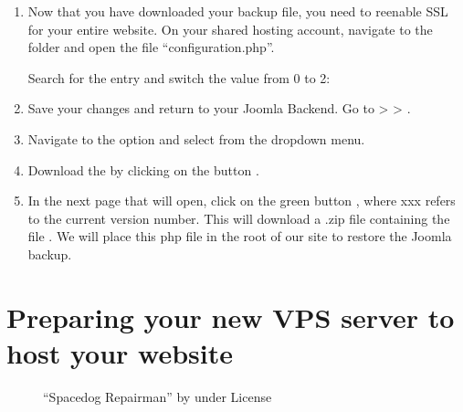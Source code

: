 \documentclass[letterpaper,10pt,english]{sphinxmanual}
\let\sphinxpxdimen\pdfpxdimen\else\newdimen\sphinxpxdimen
\begin{document}
\begin{enumerate}
\item {} 
\sphinxAtStartPar
Now that you have downloaded your backup file, you need to re\sphinxhyphen{}enable SSL for your entire website. On your shared hosting account, navigate to the folder  and open the file “configuration.php”.

\sphinxAtStartPar
Search for the entry  and switch the value from 0 to 2:
\begin{quote}

\begin{sphinxVerbatim}[commandchars=\\\{\}]
\end{sphinxVerbatim}
\end{quote}

\item {} 
\sphinxAtStartPar
Save your changes and return to your Joomla Backend. Go to  >  > .

\item {} 
\sphinxAtStartPar
Navigate to the option  and select  from the drop\sphinxhyphen{}down menu.

\item {} 
\sphinxAtStartPar
Download the  by clicking on the button .

\item {} 
\sphinxAtStartPar
In the next page that will open, click on the green button , where xxx refers to the current version number. This will download a .zip file containing the file . We will place this php file in the root of our site to restore the Joomla backup.

\end{enumerate}


\section{Preparing your new VPS server to host your website}
\label{\detokenize{joomla-to-vps:preparing-your-new-vps-server-to-host-your-website}}
\begin{figure}[htbp]
\centering
\capstart

\noindent\sphinxincludegraphics[width=450\sphinxpxdimen]{{spacedog-repairman-mini}.png}
\caption{“Spacedog Repairman” by  under  License}\label{\detokenize{joomla-to-vps:id2}}\end{figure}
\end{document}
